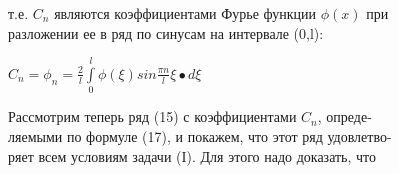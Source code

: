 \documentclass[12pt]{article}
\begin{document}
\textnormal{т.е. $C_n$ являются коэффициентами Фурье функции $\phi(x)$ при \\ разложении ее в ряд по синусам на интервале (0,l):}

\begin{center}
$C_n=\phi_n=\frac{2}{l}\int\limits_0^l\phi(\xi)sin\frac{\pi n}{l}\xi\bullet d\xi$   
\end{center}

\textnormal{\hspace{0.5cm}Рассмотрим теперь ряд (15) с коэффициентами $C_n$, опреде-\\ ляемыми по формуле (17), и покажем, что этот ряд удовлетво-\\ряет всем условиям задачи (I). Для этого надо доказать, что}
\end{document}
